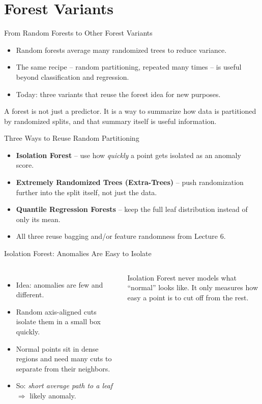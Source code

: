 \section{Forest Variants}

\begin{frame}{From Random Forests to Other Forest Variants}
\begin{itemize}
  \item Random forests average many randomized trees to reduce variance.
  \pause
  \item The same recipe -- random partitioning, repeated many times -- is useful beyond classification and regression.
  \pause
  \item Today: three variants that reuse the forest idea for new purposes.
\end{itemize}

\pause
\begin{rlintuition}
A forest is not just a predictor. It is a way to summarize how data is partitioned by randomized splits, and that summary itself is useful information.
\end{rlintuition}
\end{frame}

\begin{frame}{Three Ways to Reuse Random Partitioning}
\begin{itemize}
  \item \textbf{Isolation Forest} -- use how \emph{quickly} a point gets isolated as an anomaly score.
  \pause
  \item \textbf{Extremely Randomized Trees (Extra-Trees)} -- push randomization further into the split itself, not just the data.
  \pause
  \item \textbf{Quantile Regression Forests} -- keep the full leaf distribution instead of only its mean.
  \pause
  \item All three reuse bagging and/or feature randomness from Lecture 6.
\end{itemize}
\end{frame}

\begin{frame}{Isolation Forest: Anomalies Are Easy to Isolate}
\begin{columns}[T]
\begin{itemize}
  \item Idea: anomalies are few and different.
  \pause
  \item Random axis-aligned cuts isolate them in a small box quickly.
  \pause
  \item Normal points sit in dense regions and need many cuts to separate from their neighbors.
  \pause
  \item So: \emph{short average path to a leaf} $\Rightarrow$ likely anomaly.
\end{itemize}

\pause
{}
\begin{rlintuition}
Isolation Forest never models what ``normal'' looks like. It only measures how easy a point is to cut off from the rest.
\end{rlintuition}
\end{columns}
\end{frame}

